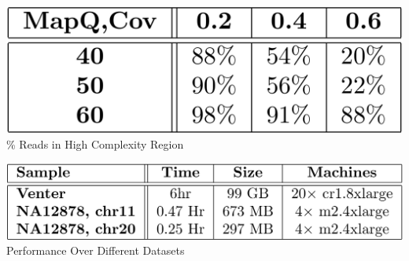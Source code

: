 \documentclass[11pt]{a0poster}
\begin{document}
{\begin{minipage}[t][2045pt][t]{\linewidth}
\begin{minipage}{0.6\linewidth}
{\begin{minipage}[t][500pt][t]{\linewidth}
\begin{minipage}{0.3\linewidth}
\end{minipage}
\begin{minipage}{0.03\linewidth}
\hfill
\pagebreak
\end{minipage}
\begin{minipage}{0.3\linewidth}
\color{Blue}
\begin{center}
\includegraphics[width=\linewidth]{complexity_sweep.pdf}
\% Reads in High Complexity Region
\end{center}
\color{Blue}
\begin{center}
\includegraphics[width=\linewidth]{dataset_runs.pdf}
Performance Over Different Datasets
\end{center}
\end{minipage}
\pagebreak
\end{minipage}
}


\end{minipage}
\end{minipage}}
\end{document}
